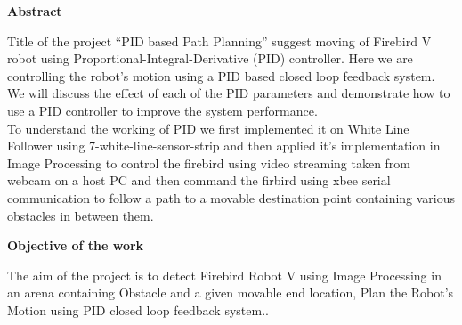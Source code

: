 \documentclass[report]{res}
\begin{document}
	\pagebreak
	
	
	\begin{center}
		{\huge \textbf{Abstract}\par}
	\end{center}
	Title of the project “PID based Path Planning” suggest moving of Firebird V robot using Proportional-Integral-Derivative (PID) controller. Here we are controlling the robot’s motion using a PID based closed loop feedback system. We will discuss the effect of each of the PID parameters and demonstrate how to use a PID controller to improve the system performance. \\
	
	To understand the working of PID we first implemented it on White Line Follower using 7-white-line-sensor-strip and then applied it's implementation in Image Processing to control the firebird using video streaming taken from webcam on a host PC and then command the firbird using xbee serial communication to follow a path to a movable destination point containing various obstacles in between them. \\
	
	\begin{center}
		{\huge \textbf{Objective of the work}\par}
	\end{center}
		The aim of the project is to detect Firebird Robot V using Image Processing in an arena containing  Obstacle and a given movable end location, Plan the Robot’s Motion using PID closed loop feedback system.. \\
		
\end{document}
